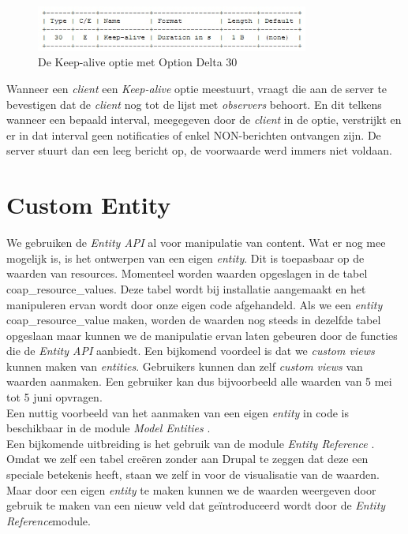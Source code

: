 \begin{figure}[h!]
\centering
\includegraphics[width=0.8\textwidth]{fig/keep_alive}
\caption{De Keep-alive optie met Option Delta 30}
\end{figure}

Wanneer een \textit{client} een \textit{Keep-alive} optie meestuurt, vraagt die aan de server te bevestigen dat de \textit{client} nog tot de lijst met \textit{observers} behoort. En dit telkens wanneer een bepaald interval, meegegeven door de \textit{client} in de optie, verstrijkt en er in dat interval geen notificaties of enkel NON-berichten ontvangen zijn. De server stuurt dan een leeg bericht op, de voorwaarde werd immers niet voldaan.

\section{Custom Entity} \label{customEntity}
We gebruiken de \textit{Entity API} al voor manipulatie van content. Wat er nog mee mogelijk is, is het ontwerpen van een eigen \textit{entity}. Dit is toepasbaar op de waarden van resources. Momenteel worden waarden opgeslagen in de tabel coap\_resource\_values. Deze tabel wordt bij installatie aangemaakt en het manipuleren ervan wordt door onze eigen code afgehandeld. Als we een \textit{entity} coap\_resource\_value maken, worden de waarden nog steeds in dezelfde tabel opgeslaan maar kunnen we de manipulatie ervan laten gebeuren door de functies die de \textit{Entity API} aanbiedt. Een bijkomend voordeel is dat we \textit{custom views} kunnen maken van \textit{entities}. Gebruikers kunnen dan zelf \textit{custom views} van waarden aanmaken. Een gebruiker kan dus bijvoorbeeld alle waarden van 5 mei tot 5 juni opvragen.\\
Een nuttig voorbeeld van het aanmaken van een eigen \textit{entity} in code is beschikbaar in de module \textit{Model Entities} \cite{modelEntities}.\\

Een bijkomende uitbreiding is het gebruik van de module \textit{Entity Reference} \cite{entityReference}. Omdat we zelf een tabel cre\"{e}ren zonder aan Drupal te zeggen dat deze een speciale betekenis heeft, staan we zelf in voor de visualisatie van de waarden. Maar door een eigen \textit{entity} te maken kunnen we de waarden weergeven door gebruik te maken van een nieuw veld dat ge\"{i}ntroduceerd wordt door de \textit{Entity Reference}module.

